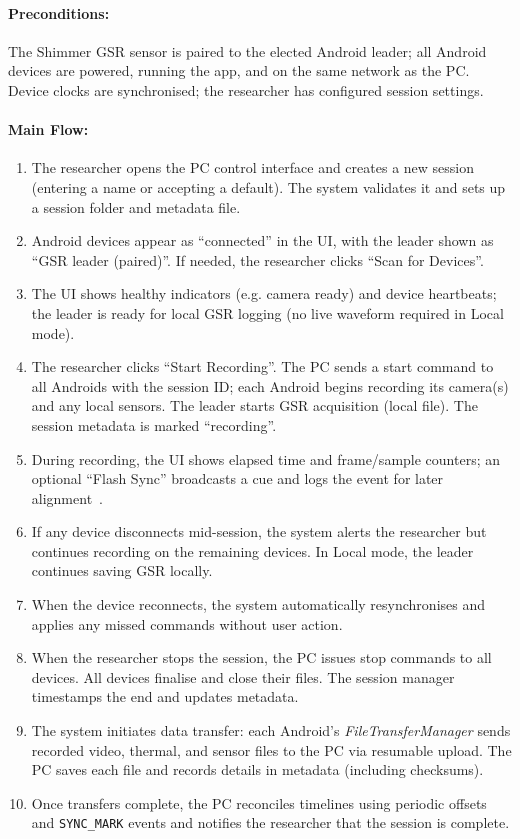 \documentclass{report}
\begin{document}
    \paragraph{Preconditions:} The Shimmer GSR sensor is paired to the elected Android leader; all Android devices are powered, running the app, and on the same network as the PC. Device clocks are synchronised; the researcher has configured session settings.
    \paragraph{Main Flow:}
    \begin{enumerate}
        \item The researcher opens the PC control interface and creates a new session (entering a name or accepting a default). The system validates it and sets up a session folder and metadata file.
        \item Android devices appear as “connected” in the UI, with the leader shown as “GSR leader (paired)”. If needed, the researcher clicks “Scan for Devices”.
        \item The UI shows healthy indicators (e.g. camera ready) and device heartbeats; the leader is ready for local GSR logging (no live waveform required in Local mode).
        \item The researcher clicks “Start Recording”. The PC sends a start command to all Androids with the session ID; each Android begins recording its camera(s) and any local sensors. The leader starts GSR acquisition (local file). The session metadata is marked “recording”.
        \item During recording, the UI shows elapsed time and frame/sample counters; an optional “Flash Sync” broadcasts a cue and logs the event for later alignment~\cite{peirce2019psychopy}.
        \item If any device disconnects mid-session, the system alerts the researcher but continues recording on the remaining devices. In Local mode, the leader continues saving GSR locally.
        \item When the device reconnects, the system automatically resynchronises and applies any missed commands without user action.
        \item When the researcher stops the session, the PC issues stop commands to all devices. All devices finalise and close their files. The session manager timestamps the end and updates metadata.
        \item The system initiates data transfer: each Android’s \textit{FileTransferManager} sends recorded video, thermal, and sensor files to the PC via resumable upload. The PC saves each file and records details in metadata (including checksums).
        \item Once transfers complete, the PC reconciles timelines using periodic offsets and \texttt{SYNC\_MARK} events and notifies the researcher that the session is complete.
    \end{enumerate}
\end{document}

